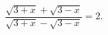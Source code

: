 \begin{ex}[type=equation]
	\begin{condition}
		$\dfrac{\sqrt{3+x} + \sqrt{3 - x}}{\sqrt{3 + x} - \sqrt{3 - x}} = 2.$
	\end{condition}
\end{ex}